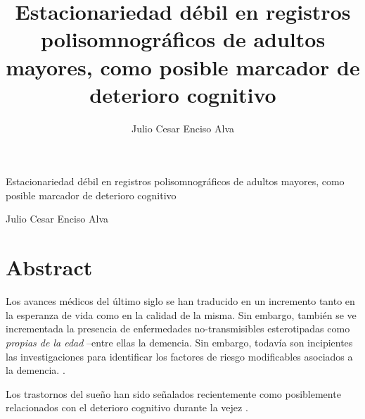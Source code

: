 \documentclass[12pt,a4paper]{mitthesis}
\begin{document}

\title{Estacionariedad d\'ebil en registros polisomnogr\'aficos de adultos mayores,
como posible marcador de deterioro cognitivo}
%
\author{Julio Cesar Enciso Alva}

\begin{center}
\huge{Estacionariedad d\'ebil en registros polisomnogr\'aficos de adultos mayores,
como posible marcador de deterioro cognitivo}


\Large{Julio Cesar Enciso Alva}
\end{center}

\newpage


\chapter*{Abstract}

Los avances m\'edicos del \'ultimo siglo se han traducido en un incremento tanto en la esperanza
de vida como en la calidad de la misma. Sin embargo, tambi\'en se ve incrementada la presencia
de enfermedades no-transmisibles esterotipadas como \textit{propias de la edad} --entre ellas la 
demencia.
Sin embargo, todav\'ia son incipientes las investigaciones para identificar los factores de riesgo 
modificables asociados a la demencia. \cite{PlanAlzheimer04}.

Los trastornos del sue\~no han sido se\~nalados recientemente como posiblemente relacionados con el 
deterioro cognitivo durante la vejez \cite{Amer13,Miyata13}.
\end{document}
